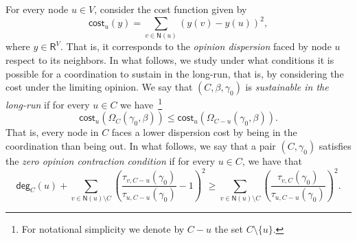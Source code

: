 \documentclass[letterpaper,11pt]{article}
\newcommand{\RR}{\mathsf{R}}
\newcommand{\ZZ}{\mathbb{Z}}
\newcommand{\EE}{\mathsf{E}}
\newcommand{\nsf}{\mathsf{N}}
\newcommand{\cost}{\mathsf{cost}}
\newcommand{\degsf}{\mathsf{deg}}
\newcommand{\vvcom}[1]{\todo[color=red!25!white]{Victor: #1}}
\begin{document}
For every node $u\in V$, consider the cost function given by
\begin{equation*}
\cost_u(y)=\sum_{v\in \nsf(u)}(y(v)-y(u))^2,
\end{equation*} 
where $y\in \RR^V$.
That is, it corresponds to the {\it opinion dispersion} faced by node $u$ respect to its neighbors. 
In what follows, we study under what conditions it is possible for a coordination to sustain in the long-run, that is, by considering the cost under the limiting opinion.
We say that $(C,\beta,\gamma_0)$ is {\it sustainable in the long-run} if for every $u\in C$ we have~\footnote{For notational simplicity we denote by $C-u$ the set $C\setminus \{u\}$.} 
\begin{equation*}
\cost_u(\Omega_C(\gamma_0,\beta))\le \cost_u(\Omega_{C-u}(\gamma_0,\beta)).
\end{equation*}
That is, every node in $C$ faces a lower dispersion cost by being in the coordination than being out.
In what follows, we say that a pair $(C,\gamma_0)$ satisfies the {\it zero opinion contraction condition} if for every $u\in C$, we have that 
\begin{equation*}
\degsf_C(u) + \sum_{v\in \nsf(u)\setminus C}\left(\frac{\tau_{v,C-u}(\gamma_0)}{\tau_{u,C-u}(\gamma_0)}-1\right)^2\ge \sum_{v\in \nsf(u)\setminus C}\left(\frac{\tau_{v,C}(\gamma_0)}{\tau_{u,C-u}(\gamma_0)}\right)^2.
\end{equation*}
\end{document}
